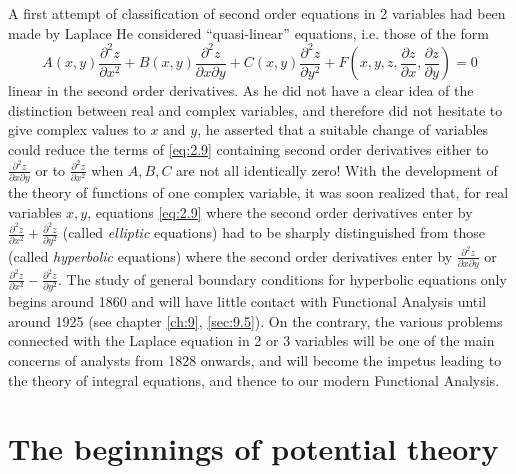 \documentclass[12pt,a4paper,leqno,twoside]{extbook}
\newcommand{\pder}[2]{\frac{\partial #1}{\partial #2}}
\begin{document}
A first attempt of classification of second order equations in 2 variables had been made by Laplace \cite[vol.~IX, p.~21--28]{137} He considered ``quasi-linear'' equations, i.e. those of the form
\begin{equation}
  \label{eq:2.9}
    A(x,y) \frac{\partial^2 z}{\partial x^2} + B(x,y) \frac{\partial^2 z}{\partial x \partial y} + C(x,y) \frac{\partial^2 z}{\partial y^2} + F\left( x,y,z, \pder{z}{x}, \pder{z}{y} \right) = 0
\end{equation}
linear in the second order derivatives. As he did not have a clear idea of the distinction between real and complex variables, and therefore did not hesitate to give complex values to \(x\) and \(y\), he asserted that a suitable change of variables could reduce the terms of \eqref{eq:2.9} containing second order derivatives either to \(\frac{\partial^2 z}{\partial x \partial y}\) or to \(\frac{\partial^2 z}{\partial x^2}\) when \(A, B, C\) are not all identically zero! With the development of the theory of functions of one complex variable, it was soon realized that, for real variables \(x, y\), equations \eqref{eq:2.9} where the second order derivatives enter by \(\frac{\partial^2 z}{\partial x^2} + \frac{\partial^2 z}{\partial y^2}\) (called \emph{elliptic} equations) had to be sharply distinguished from those (called \emph{hyperbolic} equations) where the second order derivatives enter by \(\frac{\partial^2 z}{\partial x \partial y}\) or \(\frac{\partial^2 z}{\partial x^2} - \frac{\partial^2 z}{\partial y^2}\). The study of general boundary conditions for hyperbolic equations only begins around 1860 and will have little contact with Functional Analysis until around 1925 (see chapter \ref{ch:9}, \ref{sec:9.5}). On the contrary, the various problems connected with the Laplace equation in 2 or 3 variables will be one of the main concerns of analysts from 1828 onwards, and will become the impetus leading to the theory of integral equations, and thence to our modern Functional Analysis.

\section{The beginnings of potential theory}
\label{sec:2.3}
\end{document}
